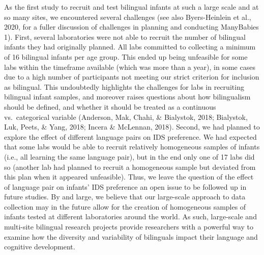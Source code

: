 \documentclass[
  english,
  ,man,floatsintext]{apa6}
\begin{document}
As the first study to recruit and test bilingual infants at such a large scale and at so many sites, we encountered several challenges (see also Byers-Heinlein et al., 2020, for a fuller discussion of challenges in planning and conducting ManyBabies 1). First, several laboratories were not able to recruit the number of bilingual infants they had originally planned. All labs committed to collecting a minimum of 16 bilingual infants per age group. This ended up being unfeasible for some labs within the timeframe available (which was more than a year), in some cases due to a high number of participants not meeting our strict criterion for inclusion as bilingual. This undoubtedly highlights the challenges for labs in recruiting bilingual infant samples, and moreover raises questions about how bilingualism should be defined, and whether it should be treated as a continuous vs.~categorical variable (Anderson, Mak, Chahi, \& Bialystok, 2018; Bialystok, Luk, Peets, \& Yang, 2018; Incera \& McLennan, 2018). Second, we had planned to explore the effect of different language pairs on IDS preference. We had expected that some labs would be able to recruit relatively homogeneous samples of infants (i.e., all learning the same language pair), but in the end only one of 17 labs did so (another lab had planned to recruit a homogeneous sample but deviated from this plan when it appeared unfeasible). Thus, we leave the question of the effect of language pair on infants' IDS preference an open issue to be followed up in future studies. By and large, we believe that our large-scale approach to data collection may in the future allow for the creation of homogeneous samples of infants tested at different laboratories around the world. As such, large-scale and multi-site bilingual research projects provide researchers with a powerful way to examine how the diversity and variability of bilinguals impact their language and cognitive development.
\end{document}

